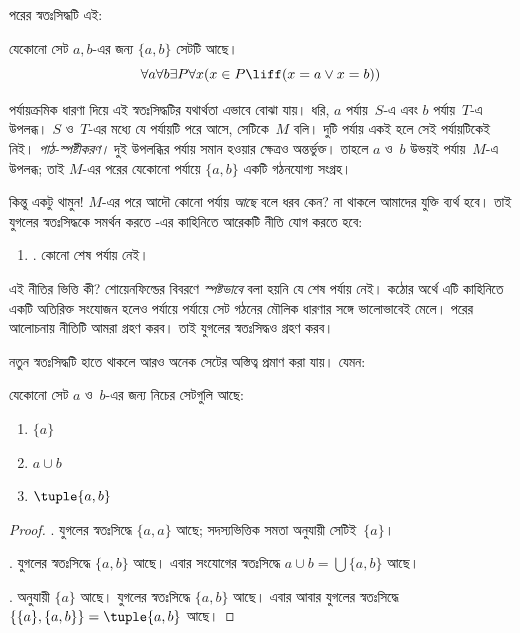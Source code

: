 \documentclass[../../../include/open-logic-section]{subfiles}
\begin{document}

পরের স্বতঃসিদ্ধটি এই:

\begin{axiom}[যুগল]
যেকোনো সেট $a, b$-এর জন্য $\{a, b\}$ সেটটি আছে।
\[
  \forall a \forall b \exists P \forall x (x \in P \liff (x = a \lor x = b))
\]
\end{axiom}

পর্যায়ক্রমিক ধারণা দিয়ে এই স্বতঃসিদ্ধটির যথার্থতা
এভাবে বোঝা যায়। ধরি, $a$ পর্যায়~$S$-এ এবং $b$
পর্যায়~$T$-এ উপলব্ধ। $S$ ও~$T$-এর মধ্যে যে পর্যায়টি
পরে আসে, সেটিকে~$M$ বলি।
দুটি পর্যায় একই হলে সেই পর্যায়টিকেই নিই।
\emph{পাঠ-স্পষ্টীকরণ।} দুই উপলব্ধির পর্যায় সমান হওয়ার ক্ষেত্রও অন্তর্ভুক্ত।
তাহলে $a$ ও~$b$ উভয়ই
পর্যায়~$M$-এ উপলব্ধ; তাই $M$-এর পরের যেকোনো
পর্যায়ে $\{a,b\}$ একটি গঠনযোগ্য সংগ্রহ।

কিন্তু একটু থামুন!{} $M$-এর পরে আদৌ কোনো পর্যায়
\emph{আছে} বলে ধরব কেন? না থাকলে আমাদের যুক্তি
ব্যর্থ হবে। তাই যুগলের স্বতঃসিদ্ধকে সমর্থন করতে
-এর কাহিনিতে আরেকটি নীতি
যোগ করতে হবে:
\begin{enumerate}
  \item[] \stagessucc. কোনো শেষ পর্যায় নেই।
\end{enumerate}
এই নীতির ভিত্তি কী? শোয়েনফিল্ডের বিবরণে
\emph{স্পষ্টভাবে} বলা হয়নি যে শেষ পর্যায় নেই।
কঠোর অর্থে এটি কাহিনিতে একটি অতিরিক্ত সংযোজন
হলেও পর্যায়ে পর্যায়ে সেট গঠনের মৌলিক ধারণার
সঙ্গে ভালোভাবেই মেলে। পরের আলোচনায় নীতিটি
আমরা গ্রহণ করব। তাই যুগলের স্বতঃসিদ্ধও গ্রহণ করব।

নতুন স্বতঃসিদ্ধটি হাতে থাকলে আরও অনেক সেটের
অস্তিত্ব প্রমাণ করা যায়। যেমন:

\begin{prop}
যেকোনো সেট $a$ ও~$b$-এর জন্য নিচের সেটগুলি আছে:
  \begin{enumerate}
    \item{} $\{a\}$
    \item{} $a \cup b$
    \item{} $\tuple{a, b}$
  \end{enumerate}
\end{prop}

\begin{proof}
. যুগলের স্বতঃসিদ্ধে $\{a, a\}$ আছে;
সদস্যভিত্তিক সমতা অনুযায়ী সেটিই~$\{a\}$।

. যুগলের স্বতঃসিদ্ধে $\{a, b\}$
আছে। এবার সংযোগের স্বতঃসিদ্ধে
$a \cup b = \bigcup \{a, b\}$ আছে।

.  অনুযায়ী $\{a\}$
আছে। যুগলের স্বতঃসিদ্ধে $\{a, b\}$ আছে। এবার
আবার যুগলের স্বতঃসিদ্ধে
$\{\{a\}, \{a, b\}\} = \tuple{a, b}$ আছে।
\end{proof}
\end{document}
